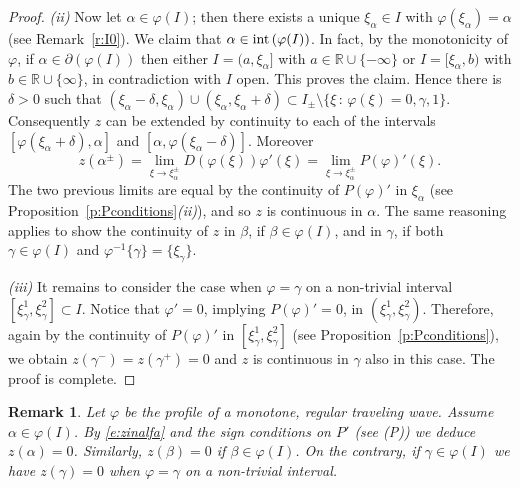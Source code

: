 \documentclass[11pt,a4paper]{article}
\newtheorem{remark}{Remark}[section]
\renewcommand{\phi}{\varphi}
\begin{document}
\begin{proof}
{\em (ii)} Now let $\alpha \in \phi(I)$; then there exists a unique $\xi_{\alpha}\in I$ with  $\phi(\xi_{\alpha})=\alpha$ (see Remark~\ref{r:I0}). We claim that $\alpha \in {\rm int}\left(\phi(I)\right)$. In fact, by the monotonicity of $\phi$, if $\alpha \in \partial\left( \phi(I)\right)$ then either $I=(a, \xi_{\alpha}]$ with $a\in \mathbb{R}\cup\{-\infty\}$ or  $I=[\xi_{\alpha}, b)$ with $b\in \mathbb{R}\cup\{\infty\}$, in contradiction with $I$ open. This proves the claim. Hence there is $\delta>0$ such that $(\xi_{\alpha}-\delta, \xi_{\alpha})\cup (\xi_{\alpha}, \xi_{\alpha}+\delta) \subset  I_{\pm}\setminus \{\xi \, : \, \phi(\xi)= 0, \gamma, 1\}$. Consequently $z$ can be extended by continuity to each of the intervals $[\phi(\xi_{\alpha}+\delta), \alpha]$ and $[\alpha, \phi(\xi_{\alpha}-\delta)]$. Moreover
\begin{equation}\label{e:zinalfa}
z(\alpha^\pm)=\lim_{\xi \to \xi_{\alpha}^\pm}D\left(\phi(\xi)\right)\phi'(\xi)=\lim_{\xi \to \xi_{\alpha}^\pm}P(\phi)'(\xi).
\end{equation}
The two previous limits are equal by the continuity of $P(\phi)'$ in $\xi_{\alpha}$ (see Proposition~\ref{p:Pconditions}{\em (ii)}), and so $z$ is continuous in $\alpha$. The same reasoning applies to show the continuity of $z$ in $\beta$, if $\beta \in \phi(I)$, and in $\gamma$, if both $\gamma \in \phi(I)$ and $\phi^{-1}\{\gamma\}=\{\xi_{\gamma}\}$. 

\smallskip
{\em (iii)} It remains to consider the case when $\phi=\gamma$ on a non-trivial interval  $[\xi^1_{\gamma}, \xi^2_{\gamma}]\subset I$. Notice that $\phi'=0$, implying $P(\phi)'=0$,  in $(\xi^1_{\gamma}, \xi^2_{\gamma})$. Therefore, again by the continuity of $P(\phi)'$ in $[\xi^1_{\gamma}, \xi^2_{\gamma}]$ (see Proposition~\ref{p:Pconditions}), we obtain $z(\gamma^-)=z(\gamma^+)=0$ and $z$ is continuous in $\gamma$ also in this case. The proof is complete.
\end{proof}

\begin{remark}\label{r:z=0}
{\rm 
Let $\phi$ be the profile of a monotone, regular traveling wave. Assume $\alpha \in \phi(I)$.  By \eqref{e:zinalfa} and the sign conditions on $P'$ (see (P)) we deduce $z(\alpha)=0$. Similarly, $z(\beta)=0$ if $\beta \in \phi(I)$. On the contrary, if $\gamma \in \phi(I)$ we have $z(\gamma)=0$ when $\phi=\gamma$ on a non-trivial interval. }
\end{remark}
\end{document}
